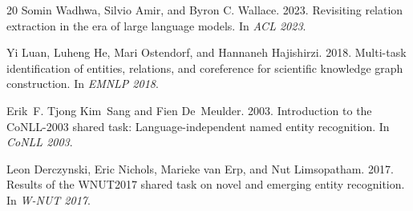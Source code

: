 \documentclass[11pt,a4paper]{article}
\begin{document}
\begin{thebibliography}{20}
Somin Wadhwa, Silvio Amir, and Byron C. Wallace. 2023.
\newblock Revisiting relation extraction in the era of large language models.
\newblock In \emph{ACL 2023}.

Yi Luan, Luheng He, Mari Ostendorf, and Hannaneh Hajishirzi. 2018.
\newblock Multi-task identification of entities, relations, and coreference for scientific knowledge graph construction.
\newblock In \emph{EMNLP 2018}.

Erik~F. Tjong Kim~Sang and Fien De~Meulder. 2003.
\newblock Introduction to the {CoNLL}-2003 shared task: Language-independent named entity recognition.
\newblock In \emph{CoNLL 2003}.

Leon Derczynski, Eric Nichols, Marieke van Erp, and Nut Limsopatham. 2017.
\newblock Results of the {WNUT}2017 shared task on novel and emerging entity recognition.
\newblock In \emph{W-NUT 2017}.

\end{thebibliography}
\end{document}
